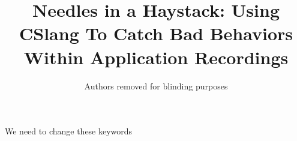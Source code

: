 \documentclass{IEEEtran}
\begin{document}
\title{Needles in a Haystack: Using CSlang To Catch Bad Behaviors Within
Application Recordings}

\newcommand{\showurlx}{[redacted]}

\author{Authors removed for blinding purposes}

\maketitle


\begin{IEEEkeywords}
  We need to change these keywords
\end{IEEEkeywords}











\end{document}
